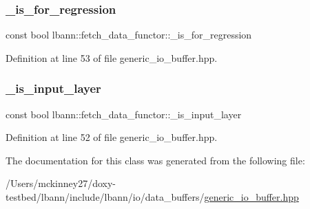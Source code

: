 \subsubsection{\texorpdfstring{\+\_\+is\+\_\+for\+\_\+regression}{\_is\_for\_regression}}
{\footnotesize\ttfamily const bool lbann\+::fetch\+\_\+data\+\_\+functor\+::\+\_\+is\+\_\+for\+\_\+regression\hspace{0.3cm}{\ttfamily [private]}}



Definition at line 53 of file generic\+\_\+io\+\_\+buffer.\+hpp.

\mbox{\label{classlbann_1_1fetch__data__functor_a8cc5a064d51a0a42e5a43c82ba576e67}} 
\subsubsection{\texorpdfstring{\+\_\+is\+\_\+input\+\_\+layer}{\_is\_input\_layer}}
{\footnotesize\ttfamily const bool lbann\+::fetch\+\_\+data\+\_\+functor\+::\+\_\+is\+\_\+input\+\_\+layer\hspace{0.3cm}{\ttfamily [private]}}



Definition at line 52 of file generic\+\_\+io\+\_\+buffer.\+hpp.



The documentation for this class was generated from the following file\+:\begin{DoxyCompactItemize}
\item 
/\+Users/mckinney27/doxy-\/testbed/lbann/include/lbann/io/data\+\_\+buffers/\hyperlink{generic__io__buffer_8hpp}{generic\+\_\+io\+\_\+buffer.\+hpp}\end{DoxyCompactItemize}
